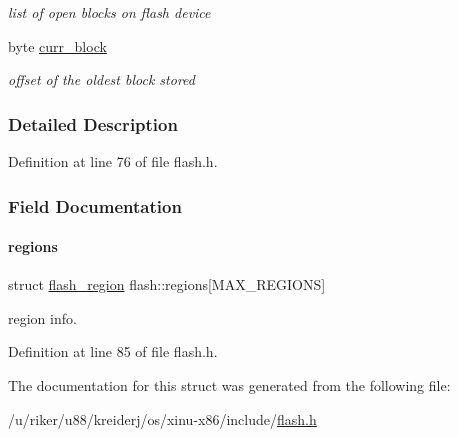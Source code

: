 \begin{DoxyCompactItemize}
\begin{DoxyCompactList}\small\item\em list of open blocks on flash device \end{DoxyCompactList}\item 
\mbox{\label{structflash_a7a7c52637b016acaec07f76cf62f59e0}} 
byte \hyperlink{structflash_a7a7c52637b016acaec07f76cf62f59e0}{curr\+\_\+block}
\begin{DoxyCompactList}\small\item\em offset of the oldest block stored \end{DoxyCompactList}\end{DoxyCompactItemize}


\subsubsection{Detailed Description}


Definition at line 76 of file flash.\+h.



\subsubsection{Field Documentation}
\mbox{\label{structflash_a07ad4035a0950608617ae37263272b6d}} 
\paragraph{\texorpdfstring{regions}{regions}}
{\footnotesize\ttfamily struct \hyperlink{structflash__region}{flash\+\_\+region} flash\+::regions\mbox{[}M\+A\+X\+\_\+\+R\+E\+G\+I\+O\+NS\mbox{]}}



region info. 



Definition at line 85 of file flash.\+h.



The documentation for this struct was generated from the following file\+:\begin{DoxyCompactItemize}
\item 
/u/riker/u88/kreiderj/os/xinu-\/x86/include/\hyperlink{flash_8h}{flash.\+h}\end{DoxyCompactItemize}
